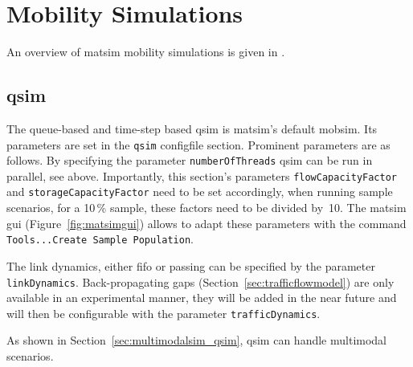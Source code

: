 \section{Mobility Simulations}
\label{sec:using-mobsims}
An overview of \gls{matsim} mobility simulations is given in \citet[][]{Dobler_TechRep_IVT_2011}. %

\subsection{\protect\gls{qsim}}
\label{sec:using-qsim}
The queue-based and time-step based \gls{qsim} \citep[][]{Dobler_TechRep_IVT_2011, Dobler_STRC_2010} is \gls{matsim}'s default \gls{mobsim}. 
Its parameters are set in the \lstinline|qsim| \gls{configfile} section. Prominent parameters are as follows. By specifying the parameter \lstinline|numberOfThreads| \gls{qsim} can be run in parallel, see above. 
Importantly, this section's parameters \lstinline|flowCapacityFactor| and \lstinline|storageCapacityFactor| need to be set accordingly, when running sample scenarios, \eg for a 10\,\% sample, these factors need to be divided by~10. The \gls{matsim} \gls{gui} (Figure~\ref{fig:matsimgui}) allows to adapt these parameters with the command \lstinline|Tools...Create Sample Population|.

The link dynamics, either \gls{fifo} or passing can be specified by the parameter \lstinline|linkDynamics|. 
Back-propagating gaps (Section~\ref{sec:trafficflowmodel}) are only available in an experimental manner, 
they will be added in the near future and will then be configurable with the parameter \lstinline|trafficDynamics|. 

As shown in Section~\ref{sec:multimodalsim_qsim}, \gls{qsim} can handle \gls{multimodal} scenarios. 


